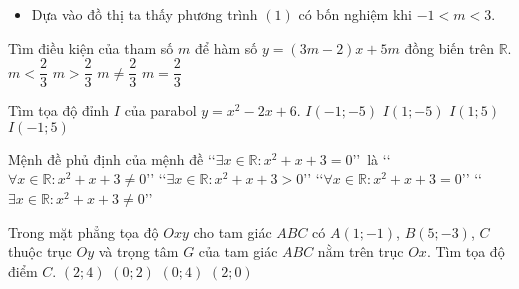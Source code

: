 \begin{ex}
{\begin{itemize}
\begin{itemize}
\begin{center}
			\end{center}
		\end{itemize}
		\item Dựa vào đồ thị ta thấy phương trình $(1)$ có bốn nghiệm khi $-1<m<3$.
	\end{itemize}	
}
\end{ex}

\begin{ex}%
	Tìm điều kiện của tham số $m$ để hàm số $y=(3m-2)x+5m$ đồng biến trên $\mathbb{R}$.
	\choice
	{$m<\dfrac{2}{3}$}
	{\True $m>\dfrac{2}{3}$}
	{$m\neq \dfrac{2}{3}$}
	{$m=\dfrac{2}{3}$}
\end{ex}

\begin{ex}%
	Tìm tọa độ đỉnh $I$ của parabol $y=x^2-2x+6$.
	\choice
	{$I(-1;-5)$}
	{$I(1;-5)$}
	{\True $I(1;5)$}
	{$I(-1;5)$}
\end{ex}

\begin{ex}%
	Mệnh đề phủ định của mệnh đề \lq\lq $\exists x\in\mathbb{R}\colon x^2+x+3=0$\rq\rq\ là
	\choice
	{\True \lq\lq $\forall x\in\mathbb{R}\colon x^2+x+3\neq 0$\rq\rq}
	{\lq\lq $\exists x\in\mathbb{R}\colon x^2+x+3>0$\rq\rq}
	{\lq\lq $\forall x\in\mathbb{R}\colon x^2+x+3=0$\rq\rq}
	{\lq\lq $\exists x\in\mathbb{R}\colon x^2+x+3\neq 0$\rq\rq}
\end{ex}

\begin{ex}%
	Trong mặt phẳng tọa độ $Oxy$ cho tam giác $ABC$ có $A(1;-1)$, $B(5;-3)$, $C$ thuộc trục $Oy$ và trọng tâm $G$ của tam giác $ABC$ nằm trên trục $Ox$. Tìm tọa độ điểm $C$.
	\choice
	{$(2;4)$}
	{$(0;2)$}
	{\True $(0;4)$}
	{$(2;0)$}
\end{ex}

